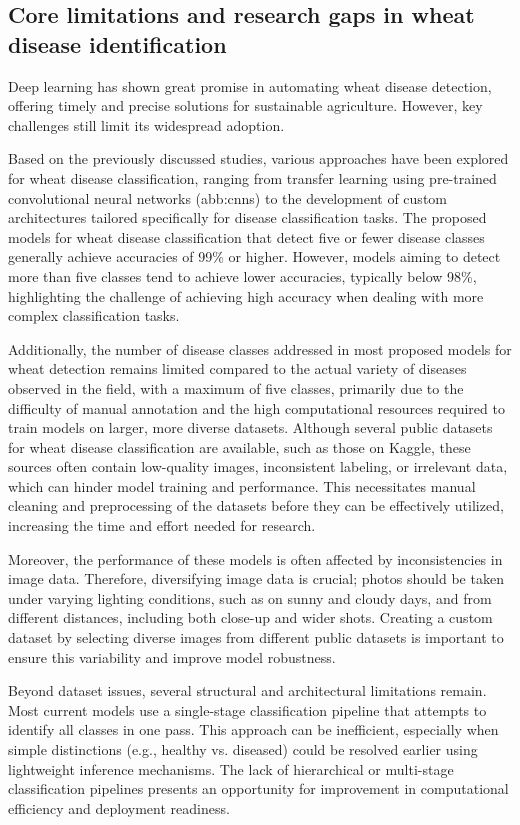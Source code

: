 \subsection{Core limitations and research gaps in wheat disease identification}
Deep learning has shown great promise in automating wheat disease detection, offering timely and precise solutions for sustainable agriculture. However, key challenges still limit its widespread adoption.

Based on the previously discussed studies, various approaches have been explored for wheat disease classification, ranging from transfer learning using pre-trained convolutional neural networks (\gls{abb:cnn}s) to the development of custom architectures tailored specifically for disease classification tasks. The proposed models for wheat disease classification that detect five or fewer disease classes generally achieve accuracies of 99\% or higher. However, models aiming to detect more than five classes tend to achieve lower accuracies, typically below 98\%, highlighting the challenge of achieving high accuracy when dealing with more complex classification tasks.

Additionally, the number of disease classes addressed in most proposed models for wheat detection remains limited compared to the actual variety of diseases observed in the field, with a maximum of five classes, primarily due to the difficulty of manual annotation and the high computational resources required to train models on larger, more diverse datasets. Although several public datasets for wheat disease classification are available, such as those on Kaggle, these sources often contain low-quality images, inconsistent labeling, or irrelevant data, which can hinder model training and performance. This necessitates manual cleaning and preprocessing of the datasets before they can be effectively utilized, increasing the time and effort needed for research.

Moreover, the performance of these models is often affected by inconsistencies in image data. Therefore, diversifying image data is crucial; photos should be taken under varying lighting conditions, such as on sunny and cloudy days, and from different distances, including both close-up and wider shots. Creating a custom dataset by selecting diverse images from different public datasets is important to ensure this variability and improve model robustness.

Beyond dataset issues, several structural and architectural limitations remain. Most current models use a single-stage classification pipeline that attempts to identify all classes in one pass. This approach can be inefficient, especially when simple distinctions (e.g., healthy vs. diseased) could be resolved earlier using lightweight inference mechanisms. The lack of hierarchical or multi-stage classification pipelines presents an opportunity for improvement in computational efficiency and deployment readiness.

